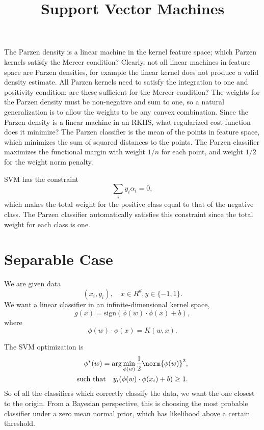 \documentclass{article}
\begin{document}
\title{\sc Support Vector Machines}
\date{}
\maketitle

The Parzen density is a linear machine in the kernel feature space; which Parzen kernels satisfy the Mercer condition?  Clearly, not all linear machines in feature space are Parzen densities, for example the linear kernel does not produce a valid density estimate.  All Parzen kernels need to satisfy the integration to one and positivity condition; are these sufficient for the Mercer condition?  The weights for the Parzen density must be non-negative and sum to one, so a natural generalization is to allow the weights to be any convex combination.  Since the Parzen density is a linear machine in an RKHS, what regularized cost function does it minimize?  The Parzen classifier is the mean of the points in feature space, which minimizes the sum of squared distances to the points.  The Parzen classifier maximizes the functional margin with weight $1/n$ for each point, and weight $1/2$ for the weight norm penalty.

SVM has the constraint
\begin{equation}
  \sum_i y_i \alpha_i = 0,
\end{equation}
which makes the total weight for the positive class equal to that of the negative class.  The Parzen classifier automatically satisfies this constraint since the total weight for each class is one.

\section{Separable Case}
We are given data
\begin{equation*}
(x_i,y_i), \quad x \in R^d, y \in \{-1,1\}.
\end{equation*}
We want a linear classifier in an infinite-dimensional kernel space,
\begin{equation}
g(x) = \text{sign}(\phi(w) \cdot \phi(x) + b),
\end{equation}
where 
\begin{equation}
\phi(w) \cdot \phi(x) = K(w,x).
\end{equation}

The SVM optimization is
\begin{align}
\phi^*(w) = \arg \min_{\phi(w)} \frac{1}{2} \norm{\phi(w)}^2, \\
\text{such that} \quad y_i (\phi(w) \cdot \phi(x_i) + b) \ge 1.
\end{align}
So of all the classifiers which correctly classify the data, we want the one closest to the origin.  From a Bayesian perspective, this is choosing the most probable classifier under a zero mean normal prior, which has likelihood above a certain threshold.
\end{document}
